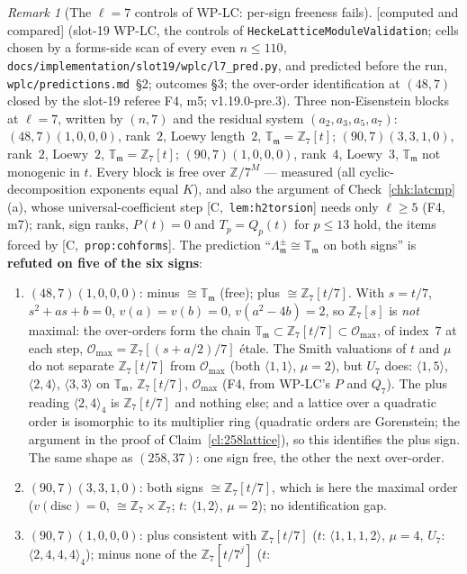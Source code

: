\documentclass[11pt]{article}
\theoremstyle{remark}
\newtheorem{remark}[theorem]{Remark}
\newcommand{\Z}{\mathbb{Z}}
\newcommand{\T}{\mathbb{T}}
\newcommand{\m}{\mathfrak{m}}
\newcommand{\HA}[1]{[C,~\texttt{#1}]}      %
\newcommand{\CMPD}{\textsf{[computed and compared]}}   %
\begin{document}
\begin{remark}[The $\ell=7$ controls of WP-LC: per-sign freeness fails]\label{rmk:latcmpseven}
\CMPD{} (slot-19 WP-LC, the controls of \texttt{HeckeLatticeModuleValidation}; cells chosen by a forms-side scan of every even $n\le110$,
\texttt{docs/implementation/slot19/wplc/l7\_pred.py}, and predicted before the run, \texttt{wplc/predictions.md}~\S2; outcomes \S3; the over-order identification at
$(48,7)$ closed by the slot-19 referee F4, m5; v1.19.0-pre.3). Three non-Eisenstein blocks at $\ell=7$, written by $(n,7)$ and the residual system
$(a_2,a_3,a_5,a_7)$: $(48,7)(1,0,0,0)$, rank~$2$, Loewy length~$2$, $\T_\m=\Z_7[t]$; $(90,7)(3,3,1,0)$, rank~$2$, Loewy~$2$, $\T_\m=\Z_7[t]$; $(90,7)(1,0,0,0)$, rank~$4$,
Loewy~$3$, $\T_\m$ not monogenic in $t$. Every block is free over $\Z/7^{M}$ --- measured (all cyclic-decomposition exponents equal $K$), and also the argument of
Check~\ref{chk:latcmp}(a), whose universal-coefficient step \HA{lem:h2torsion} needs only $\ell\ge5$ (F4, m7); rank, sign ranks, $P(t)=0$ and $T_p=Q_p(t)$ for $p\le13$
hold, the items forced by \HA{prop:cohforms}. The prediction ``$\Lambda_\m^{\pm}\cong\T_\m$ on both signs'' is \textbf{refuted on five of the six signs}:
\begin{enumerate}
\item $(48,7)(1,0,0,0)$: minus $\cong\T_\m$ (free); plus $\cong\Z_7[t/7]$. With $s=t/7$, $s^{2}+as+b=0$, $v(a)=v(b)=0$, $v(a^{2}-4b)=2$, so $\Z_7[s]$ is \emph{not} maximal: the
  over-orders form the chain $\T_\m\subset\Z_7[t/7]\subset\mathcal O_{\max}$, of index~$7$ at each step, $\mathcal O_{\max}=\Z_7[(s+a/2)/7]$ étale. The Smith valuations of $t$
  and $\mu$ do not separate $\Z_7[t/7]$ from $\mathcal O_{\max}$ (both $\langle1,1\rangle$, $\mu=2$), but $U_7$ does: $\langle1,5\rangle$, $\langle2,4\rangle$, $\langle3,3\rangle$ on
  $\T_\m$, $\Z_7[t/7]$, $\mathcal O_{\max}$ (F4, from WP-LC's $P$ and $Q_7$). The plus reading $\langle2,4\rangle_4$ is $\Z_7[t/7]$ and nothing else; and a lattice over a
  quadratic order is isomorphic to its multiplier ring (quadratic orders are Gorenstein; the argument in the proof of Claim~\ref{cl:258lattice}), so this identifies
  the plus sign. The same shape as $(258,37)$: one sign free, the other the next over-order.
\item $(90,7)(3,3,1,0)$: both signs $\cong\Z_7[t/7]$, which is here the maximal order ($v(\mathrm{disc})=0$, $\cong\Z_7\times\Z_7$; $t$: $\langle1,2\rangle$, $\mu=2$); no
  identification gap.
\item $(90,7)(1,0,0,0)$: plus consistent with $\Z_7[t/7]$ ($t$: $\langle1,1,1,2\rangle$, $\mu=4$, $U_7$: $\langle2,4,4,4\rangle_4$); minus none of the $\Z_7[t/7^{j}]$ ($t$:

\end{enumerate}
\end{remark}
\end{document}
